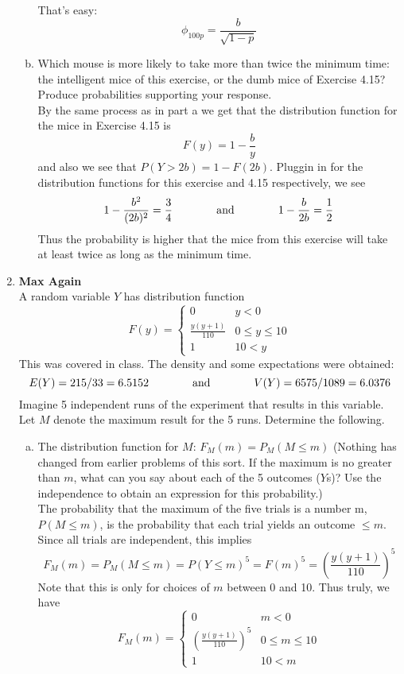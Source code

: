 \documentclass{scrartcl}
\begin{document}
\begin{enumerate}
\begin{enumerate}[a)]
That's easy:
$$\phi_{100p} = \frac{b}{\sqrt{1-p}}$$

\item Which mouse is more likely to take more than twice the minimum time: the intelligent mice of this exercise, or the dumb mice of Exercise 4.15? Produce probabilities supporting your response.\\

By the same process as in part a we get that the distribution function for the mice in Exercise 4.15 is $$F(y) = 1 - \frac{b}{y}$$ and also we see that $P(Y>2b) = 1 - F(2b)$. Pluggin in for the distribution functions for this exercise and 4.15 respectively, we see
$$ 1 - \frac{b^2}{(2b)^2} = \frac{3}{4} \text{\hspace{0.5in} and \hspace{0.5in}} 1 - \frac{b}{2b} = \frac{1}{2}$$
Thus the probability is higher that the mice from this exercise will take at least twice as long as the minimum time.
\end{enumerate}

\item \textbf{Max Again}\\
A random variable $Y$ has distribution function
\begin{displaymath}
  F(y) = \begin{cases}
    0 & y < 0\\
    \frac{y(y+1)}{110} & 0 \le y \le 10\\
    1 & 10 < y
  \end{cases}
\end{displaymath}
This was covered in class. The density and some expectations were obtained:
$$E(Y) = 215 / 33 = 6.5152 \text{\hspace{0.5in} and \hspace{0.5in}} V(Y) = 6575 / 1089 = 6.0376$$
Imagine 5 independent runs of the experiment that results in this variable. Let $M$ denote the maximum result for the 5 runs. Determine the following.
\begin{enumerate}[a)]
  \item The distribution function for $M$: $F_M(m) = P_M(M\le m)$ (Nothing has changed from earlier problems of this sort. If the maximum is no greater than $m$, what can you say about each of the 5 outcomes ($Y$s)? Use the independence to obtain an expression for this probability.)\\

    The probability that the maximum of the five trials is a number m, $P(M \le m)$, is the probability that each trial yields an outcome $\le m$. Since all trials are independent, this implies $$F_M(m) = P_M(M\le m) = P(Y\le m)^5 = F(m)^5 = \left(\frac{y(y+1)}{110}\right)^5$$ Note that this is only for choices of $m$ between 0 and 10. Thus truly, we have
\begin{displaymath}
  F_M(m) = 
  \begin{cases}
    0 & m < 0\\
    \left(\frac{y(y+1)}{110}\right)^5 & 0 \le m \le 10\\
    1 & 10 < m
  \end{cases}
\end{displaymath}


\end{enumerate}
\end{enumerate}
\end{document}
